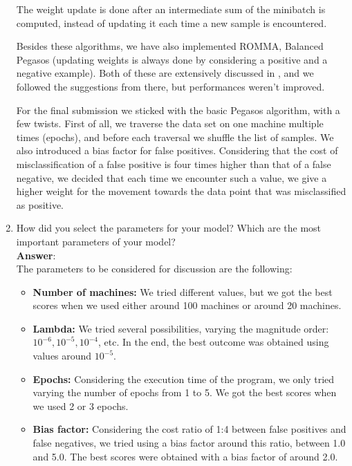 \documentclass[11pt]{article}
\begin{document}
\begin{enumerate}
The weight update is done after an intermediate sum of the minibatch is
computed, instead of updating it each time a new sample is encountered.

Besides these algorithms, we have also implemented ROMMA, Balanced
Pegasos (updating weights is always done by considering a positive and a
negative example). Both of these are extensively discussed in \cite{Sculley09}, 
and we followed the suggestions from there, but performances weren't improved.

For the final submission we sticked with the basic Pegasos algorithm, with a few twists.
First of all, we traverse the data set on one machine multiple times (epochs), 
and before each traversal we shuffle the list of samples. 
We also introduced a bias factor for false positives. Considering that the cost of 
misclassification of a false positive is four times higher than that of a false negative, 
we decided that each time we encounter such a value, we give a higher weight 
for the movement towards the data point that was misclassified as positive.


\item How did you select the parameters for your model? Which are the
  most important parameters of your model? \\
  
\textbf{Answer}: \\
The parameters to be considered for discussion are the following:
\begin{itemize}
\item{\textbf{Number of machines:}} We tried different values, but we got the best scores 
when we used either around 100 machines or around 20 machines.
\item{\textbf{Lambda:}} We tried several possibilities, varying the
magnitude order: $10^{-6}, 10^{-5}, 10^{-4}$, etc. In the end, the best
outcome was obtained using values around $10^{-5}$.
\item{\textbf{Epochs:}} Considering the execution time of the program, we only tried 
varying the number of epochs from 1 to 5. We got the best scores when we used 2 or 3 
epochs.
\item{\textbf{Bias factor:}} Considering the cost ratio of 1:4 between false positives 
and false negatives, we tried using a bias factor around this ratio, between 1.0 and 5.0.
The best scores were obtained with a bias factor of around 2.0.


\end{itemize}
\end{enumerate}
\end{document}
